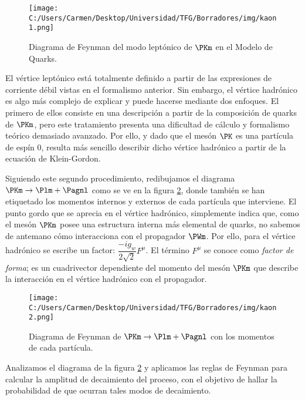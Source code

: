 \begin{figure}[ht!]
	\centering
	\texttt{[image: C:/Users/Carmen/Desktop/Universidad/TFG/Borradores/img/kaon1.png]}
	\caption[Diagrama de Feynman de quarks de $\PKm \rightarrow \Plm + \Pagnl$]
	{Diagrama de Feynman del modo leptónico de $\PKm$ en el Modelo de Quarks.}
	\label{fig:diagrama1}
\end{figure}

El vértice leptónico está totalmente definido a partir de las expresiones de corriente débil vistas en el formalismo anterior. Sin embargo, el vértice hadrónico es algo más complejo de explicar y puede hacerse mediante dos enfoques. El primero de ellos consiste en una descripción a partir de la composición de quarks de $\PKm$, pero este tratamiento presenta una dificultad de cálculo y formalismo teórico demasiado avanzado. Por ello, y dado que el mesón $\PK$ es una partícula de espín 0, resulta más sencillo describir dicho vértice hadrónico a partir de la ecuación de Klein-Gordon.

Siguiendo este segundo procedimiento, redibujamos el diagrama $\PKm \rightarrow \Plm + \Pagnl$ como se ve en la figura \ref{fig:diagrama2}, donde también se han etiquetado los momentos internos y externos de cada partícula que interviene. El punto gordo que se aprecia en el vértice hadrónico, simplemente indica que, como el mesón $\PKm$ posee una estructura interna más elemental de quarks, no sabemos de antemano cómo interacciona con el propagador $\PWm$. Por ello, para el vértice hadrónico se escribe un factor: $\dfrac{-ig_{w}}{2\sqrt{2}}F^{\mu}$. El término $F^{\mu}$ se conoce como \textit{factor de forma}; es un cuadrivector dependiente del momento del mesón $\PKm$ que describe la interacción en el vértice hadrónico con el propagador.

\begin{figure}[ht!]
	\centering
	\texttt{[image: C:/Users/Carmen/Desktop/Universidad/TFG/Borradores/img/kaon2.png]}
	\caption[Diagrama de Feynman de $\PKm \rightarrow \Plm + \Pagnl$ con los momentos]
	{Diagrama de Feynman de $\PKm \rightarrow \Plm + \Pagnl$ con los momentos de cada partícula.}
	\label{fig:diagrama2}
\end{figure}

Analizamos el diagrama de la figura \ref{fig:diagrama2} y aplicamos las reglas de Feynman para calcular la amplitud de decaimiento del proceso, con el objetivo de hallar la probabilidad de que ocurran tales modos de decaimiento. 

